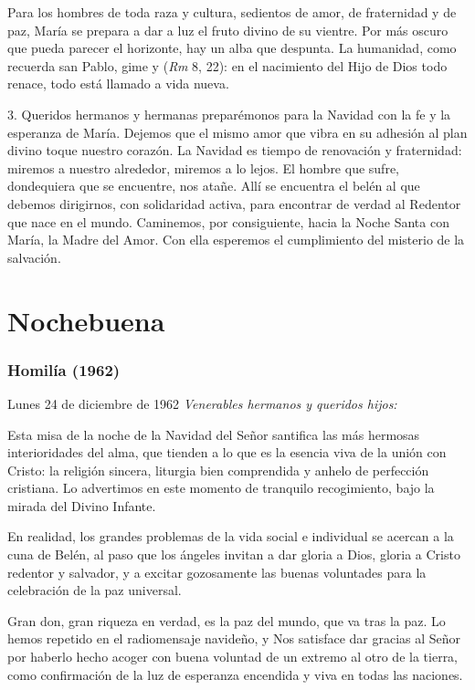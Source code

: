 Para los hombres de toda raza y cultura, sedientos de amor, de fraternidad y de paz, María se prepara a dar a luz el fruto divino de su vientre. Por más oscuro que pueda parecer el horizonte, hay un alba que despunta. La humanidad, como recuerda san Pablo, gime y  (\emph{Rm} 8, 22): en el nacimiento del Hijo de Dios todo renace, todo está llamado a vida nueva.

3. Queridos hermanos y hermanas preparémonos para la Navidad con la fe y la esperanza de María. Dejemos que el mismo amor que vibra en su adhesión al plan divino toque nuestro corazón. La Navidad es tiempo de renovación y fraternidad: miremos a nuestro alrededor, miremos a lo lejos. El hombre que sufre, dondequiera que se encuentre, nos atañe. Allí se encuentra el belén al que debemos dirigirnos, con solidaridad activa, para encontrar de verdad al Redentor que nace en el mundo. Caminemos, por consiguiente, hacia la Noche Santa con María, la Madre del Amor. Con ella esperemos el cumplimiento del misterio de la salvación.

\section{Nochebuena} \subsubsection{Homilía (1962)}

Lunes 24 de diciembre de 1962 \emph{Venerables hermanos y queridos hijos:}

Esta misa de la noche de la Navidad del Señor santifica las más hermosas interioridades del alma, que tienden a lo que es la esencia viva de la unión con Cristo: la religión sincera, liturgia bien comprendida y anhelo de perfección cristiana. Lo advertimos en este momento de tranquilo recogimiento, bajo la mirada del Divino Infante.

En realidad, los grandes problemas de la vida social e individual se acercan a la cuna de Belén, al paso que los ángeles invitan a dar gloria a Dios, gloria a Cristo redentor y salvador, y a excitar gozosamente las buenas voluntades para la celebración de la paz universal.

Gran don, gran riqueza en verdad, es la paz del mundo, que va tras la paz. Lo hemos repetido en el radiomensaje navideño, y Nos satisface dar gracias al Señor por haberlo hecho acoger con buena voluntad de un extremo al otro de la tierra, como confirmación de la luz de esperanza encendida y viva en todas las naciones.

